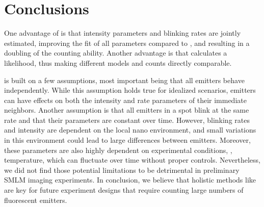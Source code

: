 \section{Conclusions}

One advantage of \ours is that intensity parameters and blinking rates are jointly estimated, improving the fit of all parameters compared to \lbfcs, and resulting in a doubling of the counting ability. 
%
Another advantage is that \ours calculates a likelihood, thus making different models and counts directly comparable. 
%

\ours is built on a few assumptions, most important being that all emitters behave independently. While this assumption holds true for idealized scenarios, emitters can have effects on both the intensity and rate parameters of their immediate neighbors.
%
Another assumption is that all emitters in a spot blink at the same rate and that their parameters are constant over time. However, blinking rates and intensity are dependent on the local nano environment, and small variations in this environment could lead to large differences between emitters.
%
Moreover, these parameters are also highly dependent on experimental conditions, \ie, temperature, which can fluctuate over time without proper controls.
%
Nevertheless, we did not find those potential limitations to be detrimental in
preliminary SMLM imaging experiments.
%
In conclusion, we believe that holistic methods like \ours are key for future
experiment designs that require counting large numbers of fluorescent emitters.
